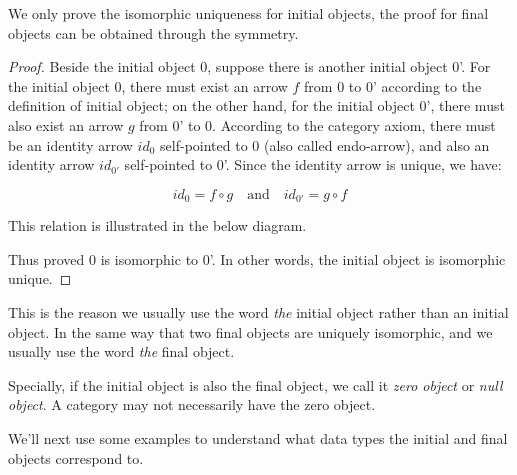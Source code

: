 \documentclass{article}
\begin{document}
We only prove the isomorphic uniqueness for initial objects, the proof for final objects can be obtained through the symmetry.

\begin{proof}
Beside the initial object 0, suppose there is another initial object 0'. For the initial object 0, there must exist an arrow $f$ from 0 to 0' according to the definition of initial object; on the other hand, for the initial object 0', there must also exist an arrow $g$ from 0' to 0. According to the category axiom, there must be an identity arrow $id_0$ self-pointed to 0 (also called endo-arrow), and also an identity arrow $id_{0'}$ self-pointed to 0'. Since the identity arrow is unique, we have:

\[
  id_0 = f \circ g \quad \text{and} \quad id_{0'} = g \circ f
\]

This relation is illustrated in the below diagram.

\begin{center}
\end{center}

Thus proved 0 is isomorphic to 0'. In other words, the initial object is isomorphic unique.
\end{proof}

This is the reason we usually use the word {\em the} initial object rather than an initial object. In the same way that two final objects are uniquely isomorphic, and we usually use the word {\em the} final object.

Specially, if the initial object is also the final object, we call it {\em zero object} or {\em null object}. A category may not necessarily have the zero object.

We'll next use some examples to understand what data types the initial and final objects correspond to.
\end{document}
